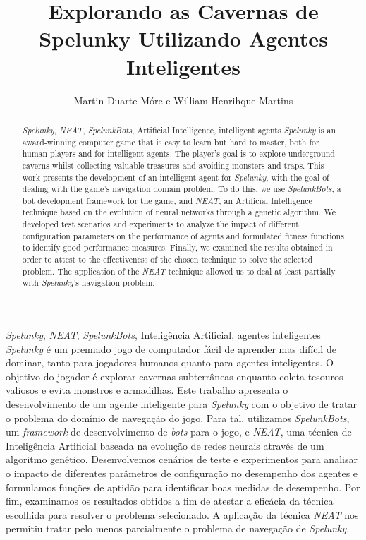 \documentclass[portuguese,oneside]{tcc}
\author{Martin Duarte Móre e William Henrihque Martins}
\title{Explorando as Cavernas de Spelunky Utilizando Agentes Inteligentes}
      {Exploring Spelunky's Caves Using Intelligent Agents}
\begin{document}



\begin{resumo}{\textit{Spelunky}, \textit{NEAT}, \textit{SpelunkBots},
	Inteligência Artificial, agentes inteligentes}
	\textit{Spelunky} é um premiado jogo de computador fácil de aprender mas
	difícil de dominar, tanto para jogadores humanos quanto para agentes
	inteligentes. O objetivo do jogador é explorar cavernas subterrâneas
	enquanto coleta tesouros valiosos e evita monstros e armadilhas. Este
	trabalho apresenta o desenvolvimento de um agente inteligente para
    \textit{Spelunky} com o objetivo de tratar o problema do domínio de
    navegação do jogo.  Para tal, utilizamos \textit{SpelunkBots}, um
    \textit{framework} de desenvolvimento de \textit{bots} para o jogo, e
    \textit{NEAT}, uma técnica de Inteligência Artificial baseada na evolução
    de redes neurais através de um algoritmo genético.  Desenvolvemos cenários
    de teste e experimentos para analisar o impacto de diferentes parâmetros de
    configuração no desempenho dos agentes e formulamos funções de aptidão para
    identificar boas medidas de desempenho. Por fim, examinamos os resultados
    obtidos a fim de atestar a eficácia da técnica escolhida para resolver o
    problema selecionado. A aplicação da técnica \textit{NEAT} nos permitiu
    tratar pelo menos parcialmente o problema de navegação de
    \textit{Spelunky}.
\end{resumo}

\begin{abstract}{\textit{Spelunky}, \textit{NEAT}, \textit{SpelunkBots},
	Artificial Intelligence, intelligent agents}
	\textit{Spelunky} is an award-winning computer game that is easy to learn
	but hard to master, both for human players and for intelligent agents. The
	player's goal is to explore underground caverns whilst collecting valuable
	treasures and avoiding monsters and traps. This work presents the
	development of an intelligent agent for \textit{Spelunky}, with the goal of
	dealing with the game's navigation domain problem. To do this, we use
	\textit{SpelunkBots}, a bot development framework for the game, and
	\textit{NEAT}, an Artificial Intelligence technique based on the evolution
	of neural networks through a genetic algorithm. We developed test scenarios
	and experiments to analyze the impact of different configuration parameters
	on the performance of agents and formulated fitness functions to identify
    good performance measures. Finally, we examined the results obtained in
    order to attest to the effectiveness of the chosen technique to solve the
    selected problem. The application of the \textit{NEAT} technique allowed us
    to deal at least partially with \textit{Spelunky}'s navigation problem.
\end{abstract}
\end{document}
